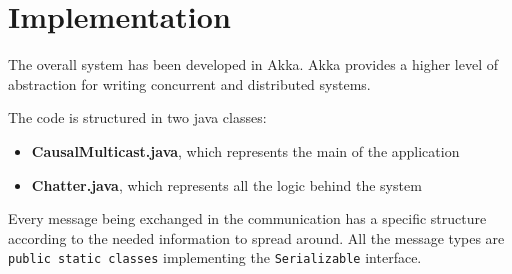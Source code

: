 \documentclass[conference]{IEEEtran}
\begin{document}

\section{Implementation}
The overall system has been developed in Akka. Akka provides a higher level of abstraction for writing concurrent and distributed systems.

The code is structured in two java classes:
\begin{itemize}
	\item \textbf{CausalMulticast.java}, which represents the main of 
	the application 
	\item \textbf{Chatter.java}, which represents all the logic behind
	the system
\end{itemize}
Every message being exchanged in the communication has a specific structure according to the needed information to spread around. 
All the message types are \texttt{public static classes} implementing the \texttt{Serializable} interface.
\end{document}
